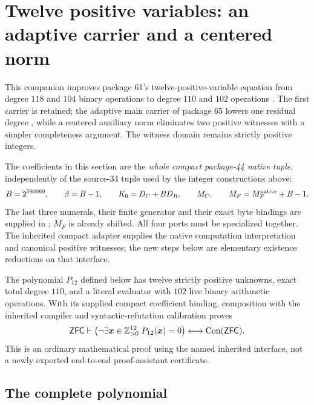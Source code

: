 \section{Twelve positive variables: an adaptive carrier and a centered norm}
\label{p12:section}

This companion improves package 61's twelve-positive-variable equation
from degree $118$ and $104$ binary operations to degree $110$ and $102$
operations \cite{p61}. The first carrier is retained; the adaptive main carrier of package 65
lowers one residual degree \cite{p65}, while a centered auxiliary norm
eliminates two positive witnesses with a simpler completeness argument.
The witness domain remains strictly positive integers.

The coefficients in this section are the \emph{whole compact package-44
native tuple}, independently of the source-34 tuple used by the integer
constructions above:
\[
 B=2^{590069},\qquad \beta=B-1,\qquad
 K_0=D_C+BD_R,\qquad M_C,\qquad M_F=M_F^{\rm native}+B-1.
\]
The last three numerals, their finite generator and their exact byte
bindings are supplied in ; $M_F$ is already
shifted. All four ports must be specialized together. The inherited
compact adapter supplies the native computation interpretation and
canonical positive witnesses; the new steps below are elementary
existence reductions on that interface.

\begin{theorem}\label{p12:theorem}
The polynomial $P_{12}$ defined below has twelve strictly positive
unknowns, exact total degree $110$, and a literal evaluator with $102$
live binary arithmetic operations. With its supplied compact coefficient
binding, composition with the inherited compiler and syntactic-refutation
calibration proves
\[
 \mathsf{ZFC}\vdash
 \bigl(\neg\exists\boldsymbol{x}\in\mathbb Z_{>0}^{12}\;
                  P_{12}(\boldsymbol{x})=0\bigr)
       \longleftrightarrow\operatorname{Con}(\mathsf{ZFC}).
\]
This is an ordinary mathematical proof using the named inherited
interface, not a newly exported end-to-end proof-assistant certificate.
\end{theorem}

\subsection{The complete polynomial}
\label{p12:definition}

